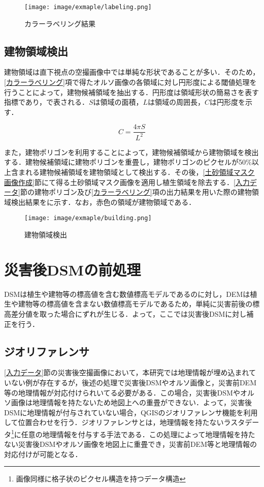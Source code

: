       \begin{figure}[t]
        \centering
        \texttt{[image: image/exmaple/labeling.png]}
        \caption{カラーラベリング結果}
        \label{カラーラベリング結果}
      \end{figure}


    \subsection{建物領域検出}
      \label{建物領域検出}
      建物領域は直下視点の空撮画像中では単純な形状であることが多い．そのため，\ref{カラーラベリング}項で得たオルソ画像の各領域に対し円形度による閾値処理を行うことによって，建物候補領域を抽出する．円形度は領域形状の簡易さを表す指標であり，で表される．$S$は領域の面積，$L$は領域の周囲長，$C$は円形度を示す．

      \begin{equation}
        \label{円形度}
        C = \dfrac{4 \pi S} {L^2} 
      \end{equation}

      また，建物ポリゴンを利用することによって，建物候補領域から建物領域を検出する．建物候補領域に建物ポリゴンを重畳し，建物ポリゴンのピクセルが50\%以上含まれる建物候補領域を建物領域として検出する．その後，\ref{土砂領域マスク画像作成}節にて得る土砂領域マスク画像を適用し植生領域を除去する．\ref{入力データ}節の建物ポリゴン及び\ref{カラーラベリング}項の出力結果を用いた際の建物領域検出結果をに示す．なお，赤色の領域が建物領域である．
      
      \begin{figure}[t]
        \centering
        \texttt{[image: image/exmaple/building.png]}
        \caption{建物領域検出}
        \label{建物領域検出結果}
      \end{figure}



  \section{災害後DSMの前処理}
    \label{災害後DSMの前処理}
    DSMは植生や建物等の標高値を含む数値標高モデルであるのに対し，DEMは植生や建物等の標高値を含まない数値標高モデルであるため，単純に災害前後の標高差分値を取った場合にずれが生じる．よって，ここでは災害後DSMに対し補正を行う．


    \subsection{ジオリファレンサ}
      \label{ジオリファレンサ}
      \ref{入力データ}節の災害後空撮画像において，本研究では地理情報が埋め込まれていない例が存在するが，後述の処理で災害後DSMやオルソ画像と，災害前DEM等の地理情報が対応付けられいてる必要がある．この場合，災害後DSMやオルソ画像は地理情報を持たないため地図上への重畳ができない．よって，災害後DSMに地理情報が付与されていない場合，QGISのジオリファレンサ機能を利用して位置合わせを行う．ジオリファレンサとは，地理情報を持たないラスタデータ\footnote{画像同様に格子状のピクセル構造を持つデータ構造}に任意の地理情報を付与する手法である．この処理によって地理情報を持たない災害後DSMやオルソ画像を地図上に重畳でき，災害前DEM等と地理情報の対応付けが可能となる．

